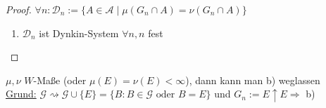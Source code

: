 \begin{proof}
	$\forall n \colon \mathscr{D}_n := \{A \in \mathscr{A} \mid \mu(G_n \cap A) = \nu(G_n \cap A)\}$
	\begin{enumerate}[label=(\alph*)]
		\item $\mathscr{D}_n$ ist Dynkin-System $\forall n, n$ fest
	\end{enumerate}
\end{proof}

\begin{remark}[Sonderfall]
	$\mu, \nu$ $W$-Maße (oder $\mu(E) = \nu(E) < \infty$), dann kann man b) weglassen\\
	\underline{Grund:} $\mathscr{G} \rightsquigarrow \mathscr{G} \cup \{E\} = \{B\colon B \in \mathscr{G} \text{ oder }B = E\}$ und $G_n := E \uparrow E \Rightarrow$ b)
\end{remark}

